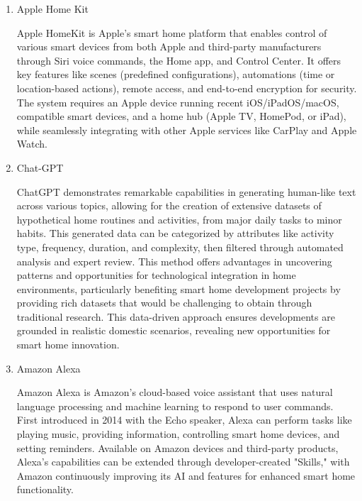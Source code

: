 \documentclass[conference]{IEEEtran}
\begin{document}
\begin{enumerate}[label=\arabic*]
    \item Apple Home Kit\par
    \vspace{0.3em}    
    Apple HomeKit is Apple's smart home platform that enables control of various smart devices from both Apple and third-party manufacturers through Siri voice commands, the Home app, and Control Center. It offers key features like scenes (predefined configurations), automations (time or location-based actions), remote access, and end-to-end encryption for security. The system requires an Apple device running recent iOS/iPadOS/macOS, compatible smart devices, and a home hub (Apple TV, HomePod, or iPad), while seamlessly integrating with other Apple services like CarPlay and Apple Watch.

    \vspace{1em}

    \item Chat-GPT\par
    \vspace{0.3em} 
    ChatGPT demonstrates remarkable capabilities in generating human-like text across various topics, allowing for the creation of extensive datasets of hypothetical home routines and activities, from major daily tasks to minor habits. This generated data can be categorized by attributes like activity type, frequency, duration, and complexity, then filtered through automated analysis and expert review. This method offers advantages in uncovering patterns and opportunities for technological integration in home environments, particularly benefiting smart home development projects by providing rich datasets that would be challenging to obtain through traditional research. This data-driven approach ensures developments are grounded in realistic domestic scenarios, revealing new opportunities for smart home innovation.
    
    \vspace{1em}

    \item Amazon Alexa\par
    \vspace{0.3em}
    Amazon Alexa is Amazon's cloud-based voice assistant that uses natural language processing and machine learning to respond to user commands. First introduced in 2014 with the Echo speaker, Alexa can perform tasks like playing music, providing information, controlling smart home devices, and setting reminders. Available on Amazon devices and third-party products, Alexa's capabilities can be extended through developer-created "Skills," with Amazon continuously improving its AI and features for enhanced smart home functionality.
    

\end{enumerate}
\end{document}
